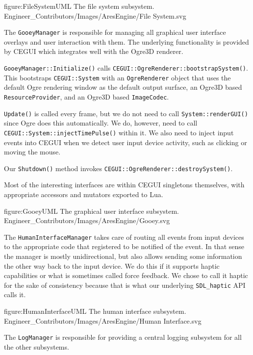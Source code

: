 \FullPageDiagram
    {figure:FileSystemUML}
    {The file system subsystem.}
    {Engineer_Contributors/Images/AresEngine/File System.svg}

\page 
{}
The {\tt GooeyManager} is responsible for managing all graphical user interface overlays and user interaction with them. The underlying functionality is provided by CEGUI which integrates well with the Ogre3D renderer.

{\tt GooeyManager::Initialize()} calls {\tt CEGUI::OgreRenderer::bootstrapSystem()}. This bootstraps {\tt CEGUI::System} with an {\tt OgreRenderer} object that uses the default Ogre rendering window as the default output surface, an Ogre3D based {\tt ResourceProvider}, and an Ogre3D based {\tt ImageCodec}.

{\tt Update()} is called every frame, but we do not need to call {\tt System::renderGUI()} since Ogre does this automatically. We do, however, need to call {\tt CEGUI::System::injectTimePulse()} within it. We also need to inject input events into CEGUI when we detect user input device activity, such as clicking or moving the mouse.

Our {\tt Shutdown()} method invokes {\tt CEGUI::OgreRenderer::destroySystem()}.

Most of the interesting interfaces are within CEGUI singletons themselves, with appropriate accessors and mutators exported to Lua.

\FullPageDiagram
    {figure:GooeyUML}
    {The graphical user interface subsystem.}
    {Engineer_Contributors/Images/AresEngine/Gooey.svg}

\page 
{}
The {\tt HumanInterfaceManager} takes care of routing all events from input devices to the appropriate code that registered to be notified of the event. In that sense the manager is mostly unidirectional, but also allows sending some information the other way back to the input device. We do this if it supports haptic capabilities or what is sometimes called force feedback. We chose to call it haptic for the sake of consistency because that is what our underlying {\tt SDL_haptic} API calls it.

\FullPageDiagram
    {figure:HumanInterfaceUML}
    {The human interface subsystem.}
    {Engineer_Contributors/Images/AresEngine/Human Interface.svg}

\page 
{}
The {\tt LogManager} is responsible for providing a central logging subsystem for all the other subsystems.

